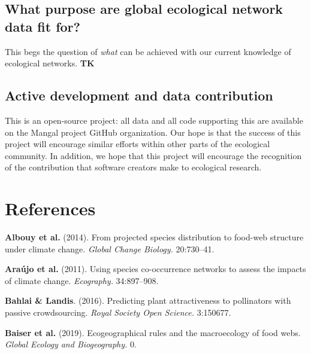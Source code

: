 \hypertarget{what-purpose-are-global-ecological-network-data-fit-for}{%
\subsection{What purpose are global ecological network data fit
for?}\label{what-purpose-are-global-ecological-network-data-fit-for}}

This begs the question of \emph{what} can be achieved with our current
knowledge of ecological networks. \textbf{TK}

\hypertarget{active-development-and-data-contribution}{%
\subsection{Active development and data
contribution}\label{active-development-and-data-contribution}}

This is an open-source project: all data and all code supporting this
are available on the Mangal project GitHub organization. Our hope is
that the success of this project will encourage similar efforts within
other parts of the ecological community. In addition, we hope that this
project will encourage the recognition of the contribution that software
creators make to ecological research.

\hypertarget{references}{%
\section*{References}\label{references}}

\hypertarget{refs}{}
\leavevmode\hypertarget{ref-AlboVele14}{}%
\textbf{Albouy et al.} (2014). From projected species distribution to
food-web structure under climate change. \emph{Global Change Biology.}
20:730--41.

\leavevmode\hypertarget{ref-ArauRoze11}{}%
\textbf{Araújo et al.} (2011). Using species co-occurrence networks to
assess the impacts of climate change. \emph{Ecography.} 34:897--908.

\leavevmode\hypertarget{ref-BahlLand16}{}%
\textbf{Bahlai \& Landis}. (2016). Predicting plant attractiveness to
pollinators with passive crowdsourcing. \emph{Royal Society Open
Science.} 3:150677.

\leavevmode\hypertarget{ref-BaisGrav19}{}%
\textbf{Baiser et al.} (2019). Ecogeographical rules and the
macroecology of food webs. \emph{Global Ecology and Biogeography.} 0.

